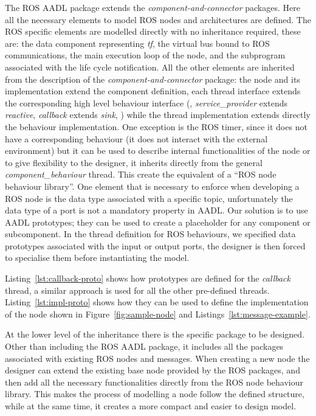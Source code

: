 The ROS AADL package extends the \textit{component-and-connector} packages. Here all the necessary elements to model ROS nodes and architectures are defined. The ROS specific elements are modelled directly with no inheritance required, these are: the data component representing \textit{tf}, the virtual bus bound to ROS communications, the main execution loop of the node, and the subprogram associated with the life cycle notification. All the other elements are inherited from the description of the \textit{component-and-connector} package: the node and its implementation extend the component definition, each thread interface extends the corresponding high level behaviour interface (\eg, \textit{service\_provider} extends \textit{reactive}, \textit{callback} extends \textit{sink}, \etc) while the thread implementation extends directly the behaviour implementation. One exception is the ROS timer, since it does not have a corresponding behaviour (it does not interact with the external environment) but it can be used to describe internal functionalities of the node or to give flexibility to the designer, it inherits directly from the general \textit{component\_behaviour} thread. This create the equivalent of a ``ROS node behaviour library''. One element that is necessary to enforce when developing a ROS node is the data type associated with a specific topic, unfortunately the data type of a port is not a mandatory property in AADL. Our solution is to use AADL prototypes; they can be used to create a placeholder for any component or subcomponent. In the thread definition for ROS behaviours, we specified data prototypes associated with the input or output ports, the designer is then forced to specialise them before instantiating the model.

Listing~\ref{lst:callback-proto} shows how prototypes are defined for the \textit{callback} thread, a similar approach is used for all the other pre-defined threads. Listing~\ref{lst:impl-proto} shows how they can be used to define the implementation of the node shown in Figure~\ref{fig:sample-node} and Listings~\ref{lst:message-example}.

At the lower level of the inheritance there is the specific package to be designed. Other than including the ROS AADL package, it includes all the packages associated with existing ROS nodes and messages. When creating a new node the designer can extend the existing base node provided by the ROS packages, and then add all the necessary functionalities directly from the ROS node behaviour library. This makes the process of modelling a node follow the defined structure, while at the same time, it creates a more compact and easier to design model. 

